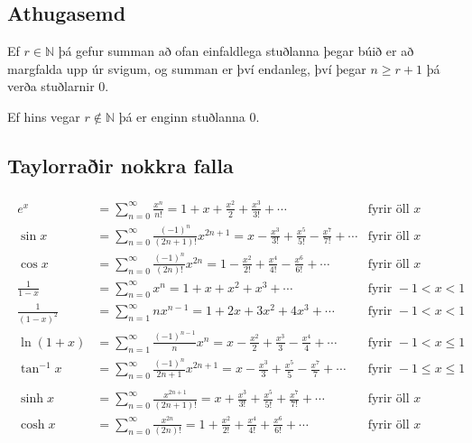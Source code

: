\documentclass[b5paper,10pt,icelandic]{sphinxmanual}
\begin{document}
\subsection{Athugasemd}
\label{\detokenize{kafli10:id6}}
Ef \(r \in {{\mathbb  N}}\) þá gefur summan að ofan einfaldlega
stuðlanna þegar búið er að margfalda upp úr svigum, og summan er því
endanleg, því þegar \(n \geq r+1\) þá verða stuðlarnir 0.

Ef hins vegar \(r\notin {{\mathbb  N}}\) þá er enginn stuðlanna 0.


\subsection{Taylorraðir nokkra falla}
\label{\detokenize{kafli10:taylorrair-nokkra-falla}}\begin{equation*}
\begin{split}\begin{aligned}
e^x&=\sum_{n=0}^\infty\frac{x^n}{n!}
    =1+x+\frac{x^2}{2}+\frac{x^3}{3!}
    +\cdots
  &\mbox{fyrir öll }x\\
\sin x&=  \sum_{n=0}^\infty\frac{(-1)^n}{(2n+1)!}x^{2n+1}
    =x-\frac{x^3}{3!}+\frac{x^5}{5!}-\frac{x^7}{7!}+\cdots
    &\mbox{fyrir öll }x\\
\cos x&=  \sum_{n=0}^\infty\frac{(-1)^n}{(2n)!}x^{2n}
    =1-\frac{x^2}{2!}+\frac{x^4}{4!}-\frac{x^6}{6!}+\cdots
    &\mbox{fyrir öll }x\\
\frac{1}{1-x}&=\sum_{n=0}^\infty x^n
    =1+x+x^2+x^3+\cdots
&\mbox{fyrir }-1<x<1\\
\frac{1}{(1-x)^2}&=\sum_{n=1}^\infty nx^{n-1}
    =1+2x+3x^2+4x^3+\cdots
&\mbox{fyrir }-1<x<1\\
\ln(1+x)&=  \sum_{n=1}^\infty\frac{(-1)^{n-1}}{n}x^n
    =x-\frac{x^2}{2}+\frac{x^3}{3}-\frac{x^4}{4}+\cdots
    &\mbox{fyrir }-1<x\leq 1\\
\tan^{-1} x&=  \sum_{n=0}^\infty\frac{(-1)^n}{2n+1}x^{2n+1}
    =x-\frac{x^3}{3}+\frac{x^5}{5}-\frac{x^7}{7}+\cdots
    &\mbox{fyrir }-1\leq x\leq 1\\\\
\sinh x&=  \sum_{n=0}^\infty\frac{x^{2n+1}}{(2n+1)!}
    =x+\frac{x^3}{3!}+\frac{x^5}{5!}+\frac{x^7}{7!}+\cdots
    &\mbox{fyrir öll } x\\
\cosh x&=  \sum_{n=0}^\infty\frac{x^{2n}}{(2n)!}
    =1+\frac{x^2}{2!}+\frac{x^4}{4!}+\frac{x^6}{6!}+\cdots
    &\mbox{fyrir öll } x\\\end{aligned}\end{split}
\end{equation*}
\end{document}
